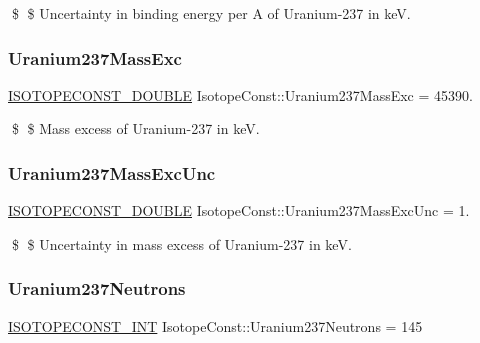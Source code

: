 \$ \$ Uncertainty in binding energy per A of Uranium-\/237 in keV. \mbox{\label{group___isotope_const-_uranium-_u237_ga6748f79f38e5e41feeae0ff87c79e5ce}} 
\subsubsection{\texorpdfstring{Uranium237\+Mass\+Exc}{Uranium237MassExc}}
{\footnotesize\ttfamily \mbox{\hyperlink{group___isotope_const-_macros_ga8f45a7272ce02c0b4c65c44636ed719a}{I\+S\+O\+T\+O\+P\+E\+C\+O\+N\+S\+T\+\_\+\+D\+O\+U\+B\+LE}} Isotope\+Const\+::\+Uranium237\+Mass\+Exc = 45390.}

\$ \$ Mass excess of Uranium-\/237 in keV. \mbox{\label{group___isotope_const-_uranium-_u237_ga63b13f814bbad660f95e3bdf9399f86a}} 
\subsubsection{\texorpdfstring{Uranium237\+Mass\+Exc\+Unc}{Uranium237MassExcUnc}}
{\footnotesize\ttfamily \mbox{\hyperlink{group___isotope_const-_macros_ga8f45a7272ce02c0b4c65c44636ed719a}{I\+S\+O\+T\+O\+P\+E\+C\+O\+N\+S\+T\+\_\+\+D\+O\+U\+B\+LE}} Isotope\+Const\+::\+Uranium237\+Mass\+Exc\+Unc = 1.}

\$ \$ Uncertainty in mass excess of Uranium-\/237 in keV. \mbox{\label{group___isotope_const-_uranium-_u237_ga7503a6d36070622836540e09a6e0880f}} 
\subsubsection{\texorpdfstring{Uranium237\+Neutrons}{Uranium237Neutrons}}
{\footnotesize\ttfamily \mbox{\hyperlink{group___isotope_const-_macros_ga5f18360b3e99483a35c32d789e62621c}{I\+S\+O\+T\+O\+P\+E\+C\+O\+N\+S\+T\+\_\+\+I\+NT}} Isotope\+Const\+::\+Uranium237\+Neutrons = 145}

